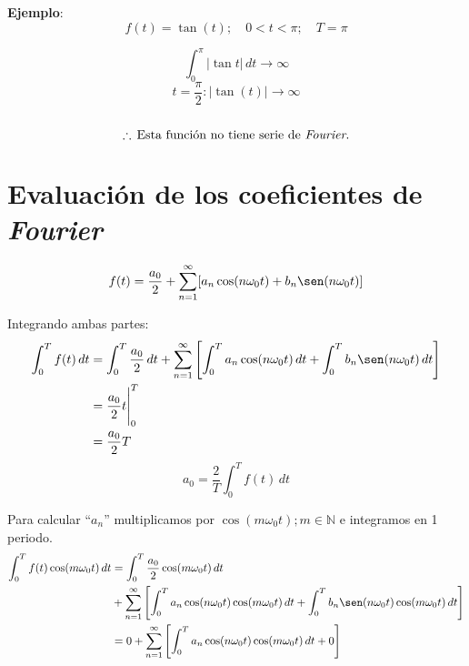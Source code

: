 \textbf{Ejemplo}:
\begin{equation*}
    f(t)=\tan(t); \quad 0<t<\pi; \quad T=\pi
\end{equation*}
\begin{figure}[H]
    \centering
    
\end{figure}
\begin{equation*}
    \int_0^\pi |\tan t|\,dt\rightarrow\infty
\end{equation*}
\begin{equation*}
    t=\frac{\pi}{2}: |\tan(t)|\rightarrow\infty
\end{equation*}
\\
\begin{equation*}
    \therefore\,\text{Esta función no tiene serie de \emph{Fourier}.}
\end{equation*}

\section{Evaluación de los coeficientes de \emph{Fourier}}
\begin{equation*}
    f(t)=\frac{a_0}{2}+
    \sum_{n=1}^{\infty}[a_n\cos(n\omega_0 t)+b_n\sen(n\omega_0 t)]
\end{equation*}

Integrando ambas partes:
\begin{equation*}
\begin{split}
    \int_{0}^{T}f(t)\,dt
        &=\int_{0}^{T}\frac{a_0}{2}\,dt+
          \sum_{n=1}^{\infty}\left[\int_{0}^{T}a_n\cos(n\omega_0 t)\,dt+
          \int_{0}^{T}b_n\sen(n\omega_0 t)\,dt\right]\\
        &=\frac{a_0}{2}t\Biggr|_{0}^{T}\\
        &=\frac{a_0}{2}T\\
\end{split}
\end{equation*}
\begin{equation}
    a_0=\frac{2}{T}\int_{0}^{T}f(t)\,dt
\end{equation}

Para calcular ``$a_n$'' multiplicamos por $\cos(m\omega_0 t); m\in\mathbb{N}$ e
integramos en 1 periodo.
\begin{equation*}
\begin{split}
    \int_{0}^{T}f(t)\cos(m\omega_0 t)\,dt
        &=\int_{0}^{T}\frac{a_0}{2}\cos(m\omega_0 t)\,dt\\
        &+\sum_{n=1}^{\infty}\left[
          \int_{0}^{T}a_n\cos(n\omega_0 t)\cos(m\omega_0 t)\,dt+
          \int_{0}^{T}b_n\sen(n\omega_0 t)\cos(m\omega_0 t)\,dt\right]\\
        &=0+\sum_{n=1}^{\infty}\left[
          \int_{0}^{T}a_n\cos(n\omega_0 t)\cos(m\omega_0 t)\,dt+0\right]\\
\end{split}
\end{equation*}

